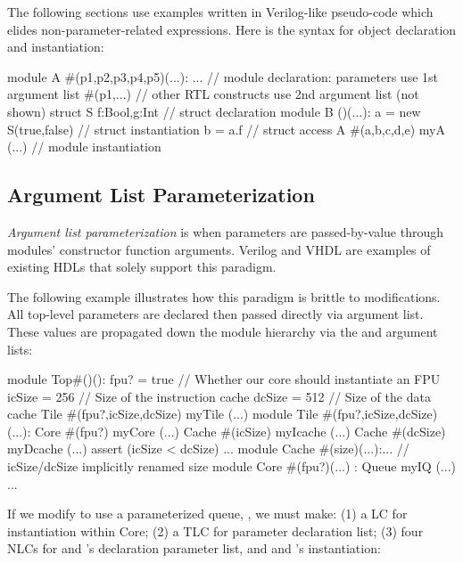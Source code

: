 The following sections use examples written in Verilog-like pseudo-code which elides non-parameter-related expressions. Here is the syntax for object declaration and instantiation:

\begin{phdl}
module A #(p1,p2,p3,p4,p5)(...): ... 
   // module declaration: parameters use 1st argument list #(p1,...)
   // other RTL constructs use 2nd argument list (not shown)
struct S {f:Bool,g:Int}          // struct declaration
module B ()(...):
  a = new S(true,false)          // struct instantiation
  b = a.f                        // struct access
  A #(a,b,c,d,e) myA (...)       // module instantiation
\end{phdl} 

\subsection{Argument List Parameterization}

\emph{Argument list parameterization} is when parameters are passed-by-value through modules' constructor function arguments. 
Verilog and VHDL are examples of existing HDLs that solely support this paradigm. 

The following example illustrates how this paradigm is brittle to modifications. All top-level parameters are declared then passed directly via  argument list. These values are propagated down the module hierarchy via the  and  argument lists:

\begin{phdl}
module Top#()():
  fpu? = true    // Whether our core should instantiate an FPU
  icSize = 256   // Size of the instruction cache
  dcSize = 512   // Size of the data cache
  Tile #(fpu?,icSize,dcSize) myTile (...)
module Tile #(fpu?,icSize,dcSize)(...):
  Core  #(fpu?) myCore (...)
  Cache #(icSize) myIcache (...)
  Cache #(dcSize) myDcache (...)
  assert (icSize < dcSize) ...
module Cache #(size)(...):... // icSize/dcSize implicitly renamed size
module Core #(fpu?)(...) :
  Queue myIQ (...) ...
\end{phdl} 

If we modify  to use a parameterized queue, , we must make: (1) a LC for  instantiation within Core; (2) a TLC for  parameter declaration list; (3) four NLCs for  and 's declaration parameter list, and  and 's instantiation:

